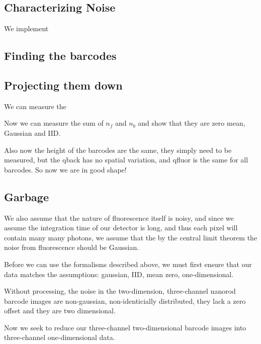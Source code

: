 \subsection{Characterizing Noise}  
We implement 
\subsection{Finding the barcodes}
\subsection{Projecting them down}


We can measure the 

Now we can measure the sum of  $n_f$ and $n_b$ and show that they are  zero mean, Gaussian and IID. 


Also now  the height of the barcodes are the same, they simply need to be measured, but the qback has no spatial variation, and qfluor is the same for all barcodes. So now we are in good shape!




\subsection{Garbage	} 

We also assume that the nature of fluorescence itself is noisy, and since we assume the integration time of our detector is long, and thus each pixel will contain many many photons, we assume that the by the central limit theorem the noise from fluorescence should be Gaussian.






Before we can use the formalisms described above, we must first ensure that our data matches the assumptions: gaussian, IID, mean zero, one-dimensional. 

Without processing, the noise in the two-dimension, three-channel nanorod barcode images are non-gaussian, non-identicially distributed, they lack a zero offset and they are two dimensional.



Now we seek to reduce our three-channel two-dimensional barcode images into three-channel one-dimensional data. 








